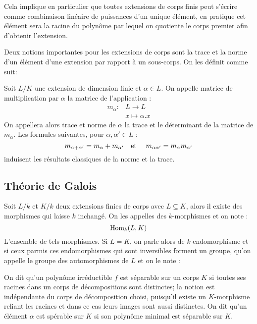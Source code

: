 \documentclass[a4paper]{article} %
\numberwithin{section}{part}
\numberwithin{equation}{section}
\newcommand\etmath{\textup{\quad et \quad}}
\begin{document}
Cela implique en particulier que toutes extensions de corps finis peut s'écrire
comme combinaison linéaire de puissances d'un unique élément, en pratique cet
élément sera la racine du polynôme par lequel on quotiente le corps premier afin
d'obtenir l'extension.
\vspace{0.3cm}

Deux notions importantes pour les extensions de corps sont la trace et la norme
d'un élément d'une extension par rapport à un sous-corps. On les définit comme
suit:

\begin{defn}
Soit $L/K$ une extension de dimension finie et $\alpha\in L$. On appelle matrice
de multiplication par $\alpha$ la matrice de l'application :
\begin{align*}
m_{\alpha} :&L \longrightarrow L\\
&x\longmapsto\alpha.x
\end{align*}
On appellera alors trace et norme de $\alpha$ la trace et le déterminant 
de la matrice de $m_{\alpha}$. Les formules suivantes, pour $\alpha, \alpha'\in
L$ :
\[ m_{\alpha + \alpha'} = m_{\alpha} + m_{\alpha'} \etmath
m_{\alpha\alpha'} = m_{\alpha}m_{\alpha'}\]
induisent les résultats classiques de la norme et la trace.
\end{defn}


\subsection{Théorie de Galois}
Soit $L/k$ et $K/k$ deux extensions finies de corps avec $L\subseteq K$, alors 
il existe des morphismes qui laisse $k$ inchangé. On les appelles des 
$k$-morphismes et on note :
\[\textup{Hom}_k(L, K)\]
L'ensemble de tels morphismes. Si $L = K$, on parle alors de $k$-endomorphisme
et si ceux parmis ces endomorphismes qui sont inversibles forment un groupe,
qu'on appelle le groupe des automorphismes de $L$ et on le note :

\vspace{0.3cm}

On dit qu'un polynôme irréductible $f$ est séparable sur un corps $K$ si toutes
ses racines dans un corps de décompositions sont distinctes; la notion est
indépendante du corps de décomposition choisi, puisqu'il existe un $K$-morphisme
reliant les racines et dans ce cas leurs images sont aussi distinctes. On dit
qu'un élément $\alpha$ est spérable sur $K$ si son polynôme minimal est 
séparable sur $K$.
\end{document}
